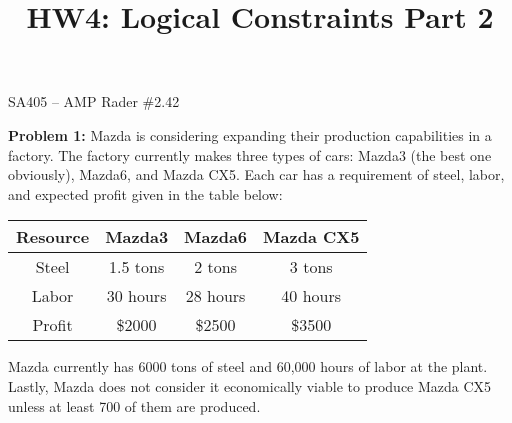 \documentclass[11pt]{article}
\makeatletter
\theoremstyle{definition}
\renewcommand{\maketitle}{
  \noindent SA405 -- AMP \hfill Rader \#2.42 \\

  \begin{center}\Large{\textbf{\@title}}\end{center}
}
\makeatother
\begin{document}
  
\title{HW4: Logical Constraints Part 2}


\maketitle


\textbf{Problem 1:} Mazda is considering expanding their production capabilities in a factory. The factory currently makes three types of cars: Mazda3 (the best one obviously), Mazda6, and Mazda CX5. Each car has a requirement of steel, labor, and expected profit given in the table below:

\begin{center}
\begin{tabular}{c|ccc} \hline
Resource & Mazda3   & Mazda6   & Mazda CX5 \\ \hline
Steel    & 1.5 tons & 2 tons   & 3 tons  \\
Labor    & 30 hours & 28 hours & 40 hours \\
Profit   & \$2000   & \$2500   & \$3500 \\ \hline
\end{tabular}
\end{center}

Mazda currently has 6000 tons of steel and 60,000 hours of labor at the plant. Lastly, Mazda does not consider it economically viable to produce Mazda CX5 unless at least 700 of them are produced.
\end{document}
